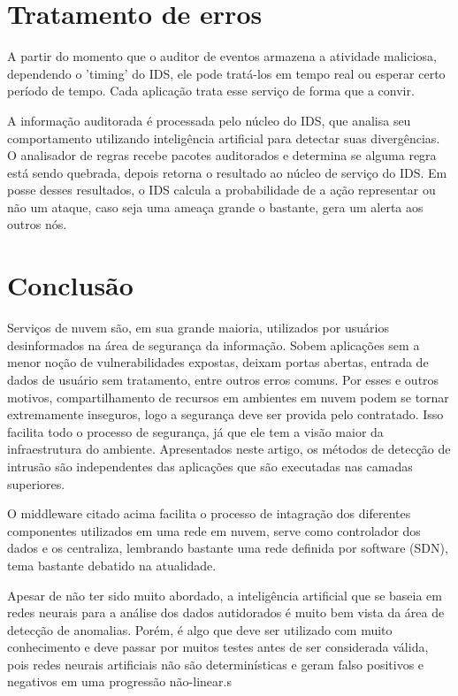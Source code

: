 \documentclass[journal]{IEEEtran}
\begin{document}
\section{Tratamento de erros}
A partir do momento que o auditor de eventos armazena a atividade maliciosa, dependendo o 'timing' do IDS, ele pode tratá-los em tempo real ou esperar certo período de tempo. Cada aplicação trata esse serviço de forma que a convir. \par
A informação auditorada é processada pelo núcleo do IDS, que analisa seu comportamento utilizando inteligência artificial para detectar suas divergências. O analisador de regras recebe pacotes auditorados e determina se alguma regra está sendo quebrada, depois retorna o resultado ao núcleo de serviço do IDS. Em posse desses resultados, o IDS calcula a probabilidade de a ação representar ou não um ataque, caso seja uma ameaça grande o bastante, gera um alerta aos outros nós.

\section{Conclusão}
Serviços de nuvem são, em sua grande maioria, utilizados por usuários desinformados na área de segurança da informação. Sobem aplicações sem a menor noção de vulnerabilidades expostas, deixam portas abertas, entrada de dados de usuário sem tratamento, entre outros erros comuns. Por esses e outros motivos, compartilhamento de recursos em ambientes em nuvem podem se tornar extremamente inseguros, logo a segurança deve ser provida pelo contratado. Isso facilita todo o processo de segurança, já que ele tem a visão maior da infraestrutura do ambiente. Apresentados neste artigo, os métodos de detecção de intrusão são independentes das aplicações que são executadas nas camadas superiores. \par
O middleware citado acima facilita o processo de intagração dos diferentes componentes utilizados em uma rede em nuvem, serve como controlador dos dados e os centraliza, lembrando bastante uma rede definida por software (SDN), tema bastante debatido na atualidade. \par
Apesar de não ter sido muito abordado, a inteligência artificial que se baseia em redes neurais para a análise dos dados autidorados é muito bem vista da área de detecção de anomalias. Porém, é algo que deve ser utilizado com muito conhecimento e deve passar por muitos testes antes de ser considerada válida, pois redes neurais artificiais não são determinísticas e geram falso positivos e negativos em uma progressão não-linear.s
\end{document}

